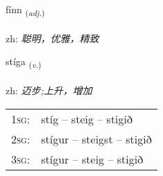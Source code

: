 \documentclass[frontgrid, backgrid]{flacards}\usepackage[]{graphicx}\usepackage[]{color}
\begin{document}
\renewcommand{\flhead}{\vskip5pt \fboxsep=0pt {\small\bfseries\footnotesize Lýsingarorð | 形容词}}
\renewcommand{\fcfoot}{\vskip5pt \fboxsep=0pt \hspace{2pt}{\small\bfseries\footnotesize 2K}}

\renewcommand{\blhead}{\vskip5pt {\small\bfseries\footnotesize Lýsingarorð | 形容词 }}
\renewcommand{\bcfoot}{\vskip5pt \hspace{2pt}{\small\bfseries\footnotesize 2K}}


{fínn \small{\textsubscript{(\textit{adj.})}} \\[1ex] %
\textphonetic{[fitn̥]} \\
zh: \emph{聪明，优雅，精致} \\  [2ex]
\renewcommand*{\arraystretch}{0.8}
}

\renewcommand{\flhead}{\vskip5pt \fboxsep=0pt {\small\bfseries\footnotesize Sagnorð | 动词}}
\renewcommand{\fcfoot}{\vskip5pt \fboxsep=0pt \hspace{2pt}{\small\bfseries\footnotesize 2K}}

\renewcommand{\blhead}{\vskip5pt {\small\bfseries\footnotesize Sagnorð | 动词 }}
\renewcommand{\bcfoot}{\vskip5pt \hspace{2pt}{\small\bfseries\footnotesize 2K}}


{stíga \small{\textsubscript{(\textit{v.})}} \\[1ex] %
\textphonetic{[stiːɣa]} \\
zh: \emph{迈步;上升，增加} \\  [2ex]
\renewcommand*{\arraystretch}{0.8}
\begin{tabular}{p{1cm}l}
\textsc{1sg}: & stíg -- steig -- stigið \\ 
\textsc{2sg}: & stígur -- steigst -- stigið \\ 
\textsc{3sg}: & stígur -- steig -- stigið \\ 
\end{tabular}
}
\end{document}
